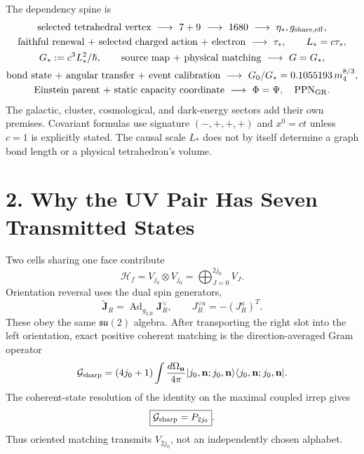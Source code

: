 \documentclass[11pt]{article}
\begin{document}
The dependency spine is
\[
\begin{gathered}
\text{selected tetrahedral vertex}\ \longrightarrow\ 7+9\ \longrightarrow\ 1680
\ \longrightarrow\ \eta_*,g_{\rm share,eff},\\
\text{faithful renewal + selected charged action + electron}
\ \longrightarrow\ \tau_*,\qquad L_*=c\tau_*,\\
G_*:=c^3L_*^2/\hbar,\qquad
\text{source map + physical matching}\ \longrightarrow\ G=G_*,\\
\text{bond state + angular transfer + event calibration}
\ \longrightarrow\ G_0/G_*=0.1055193\,m_4^{8/3},\\
\text{Einstein parent + static capacity coordinate}
\ \longrightarrow\ \Phi=\Psi,\quad \mathrm{PPN}_{\rm GR}.
\end{gathered}
\]
The galactic, cluster, cosmological, and dark-energy sectors add their own premises. Covariant formulas use signature $(-,+,+,+)$ and $x^0=ct$ unless $c=1$ is explicitly stated. The causal scale $L_*$ does not by itself determine a graph bond length or a physical tetrahedron's volume.

\section{2. Why the UV Pair Has Seven Transmitted States}

Two cells sharing one face contribute
\[
\mathcal H_f=V_{j_0}\otimes V_{j_0}
=\bigoplus_{J=0}^{2j_0}V_J.
\]
Orientation reversal uses the dual spin generators,
\[
\widetilde{\mathbf J}_R=\operatorname{Ad}_{g_{LR}}\mathbf J_R^\vee,
\qquad J_R^{\vee a}=-(J_R^a)^T.
\]
These obey the same $\mathfrak{su}(2)$ algebra. After transporting the right slot into the left orientation, exact positive coherent matching is the direction-averaged Gram operator
\[
\mathcal G_{\rm sharp}
=(4j_0+1)\int\frac{d\Omega_{\mathbf n}}{4\pi}
|j_0,\mathbf n;j_0,\mathbf n\rangle
\langle j_0,\mathbf n;j_0,\mathbf n|.
\]
The coherent-state resolution of the identity on the maximal coupled irrep gives
\[
\boxed{\mathcal G_{\rm sharp}=P_{2j_0}}.
\]
Thus oriented matching transmits $V_{2j_0}$, not an independently chosen alphabet.
\end{document}

